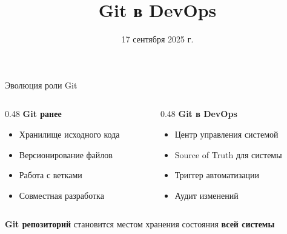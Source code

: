 \documentclass[aspectratio=169]{beamer}
\title{Git в DevOps}
\date{17 сентября 2025 г.}
\begin{document}
    \maketitle

    \begin{frame}{Эволюция роли Git}
        \begin{columns}
            \begin{column}{0.48\textwidth}
                \textbf{Git ранее}
                \begin{itemize}
                    \item Хранилище исходного кода
                    \item Версионирование файлов
                    \item Работа с ветками
                    \item Совместная разработка
                \end{itemize}
            \end{column}

            \begin{column}{0.48\textwidth}
                \textbf{Git в DevOps}
                \begin{itemize}
                    \item Центр управления системой
                    \item Source of Truth для системы
                    \item Триггер автоматизации
                    \item Аудит изменений
                \end{itemize}
            \end{column}
        \end{columns}

        \vspace{0.5cm}

        \textbf{Git репозиторий} становится местом хранения состояния \textbf{всей системы}
    \end{frame}
\end{document}
